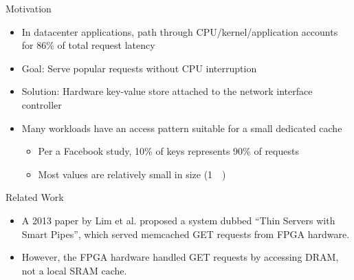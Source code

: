 \begin{block}{Motivation}
    \footnotesize
    \begin{itemize}
        \item In datacenter applications, path through CPU/kernel/application accounts for 86\% of total request latency
        \item \alert{Goal}: Serve popular requests without CPU interruption
        \item \alert{Solution}: Hardware key-value store attached to the network interface controller
        \item Many workloads have an access pattern suitable for a small
        dedicated cache
            \begin{itemize}
                \footnotesize
                \item Per a Facebook study, 10\% of keys represents 90\% of requests
                \item Most values are relatively small in size (\SI{1}{\kilo\byte})
            \end{itemize}

    \end{itemize}

\end{block}

\vspace{1ex}

\begin{block}{Related Work}
\footnotesize
\begin{itemize}
    \item A 2013 paper by Lim et al. proposed a system dubbed
        ``Thin Servers with Smart Pipes'', which served memcached GET requests
        from FPGA hardware.
    \item However, the FPGA hardware handled GET requests by accessing DRAM,
        not a local SRAM cache.
\end{itemize}

\end{block}
